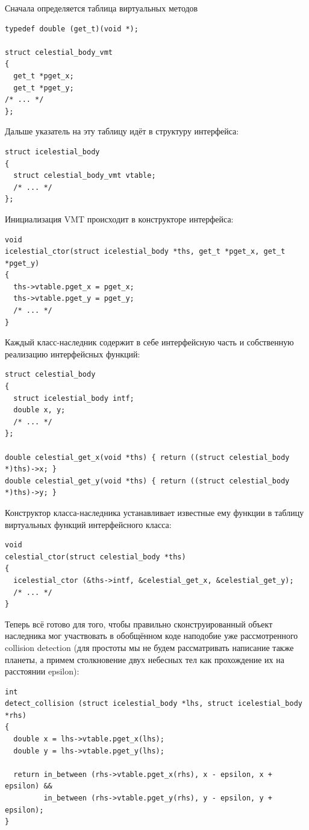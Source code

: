 \documentclass[a4paper,12pt,oneside]{article}
\begin{document}
Сначала определяется таблица виртуальных методов

\begin{lstlisting}
typedef double (get_t)(void *);

struct celestial_body_vmt
{
  get_t *pget_x;
  get_t *pget_y;
/* ... */
};
\end{lstlisting}

Дальше указатель на эту таблицу идёт в структуру интерфейса:

\begin{lstlisting}
struct icelestial_body
{
  struct celestial_body_vmt vtable;
  /* ... */
};
\end{lstlisting}

Инициализация VMT происходит в конструкторе интерфейса:

\begin{lstlisting}
void
icelestial_ctor(struct icelestial_body *ths, get_t *pget_x, get_t *pget_y)
{
  ths->vtable.pget_x = pget_x;
  ths->vtable.pget_y = pget_y;
  /* ... */
}
\end{lstlisting}

Каждый класс-наследник содержит в себе интерфейсную часть и собственную реализацию интерфейсных функций:

\begin{lstlisting}
struct celestial_body
{
  struct icelestial_body intf;
  double x, y;
  /* ... */
};

double celestial_get_x(void *ths) { return ((struct celestial_body *)ths)->x; }
double celestial_get_y(void *ths) { return ((struct celestial_body *)ths)->y; }
\end{lstlisting}

Конструктор класса-наследника устанавливает известные ему функции в таблицу виртуальных функций интерфейсного класса:

\begin{lstlisting}
void 
celestial_ctor(struct celestial_body *ths)
{
  icelestial_ctor (&ths->intf, &celestial_get_x, &celestial_get_y);
  /* ... */  
}
\end{lstlisting}

Теперь всё готово для того, чтобы правильно сконструированный объект наследника мог участвовать в обобщённом коде наподобие уже рассмотренного collision detection (для простоты мы не будем рассматривать написание также планеты, а примем столкновение двух небесных тел как прохождение их на расстоянии epsilon):

\begin{lstlisting}
int
detect_collision (struct icelestial_body *lhs, struct icelestial_body *rhs)
{
  double x = lhs->vtable.pget_x(lhs);
  double y = lhs->vtable.pget_y(lhs);
 
  return in_between (rhs->vtable.pget_x(rhs), x - epsilon, x + epsilon) && 
         in_between (rhs->vtable.pget_y(rhs), y - epsilon, y + epsilon);
}
\end{lstlisting}
\end{document}
